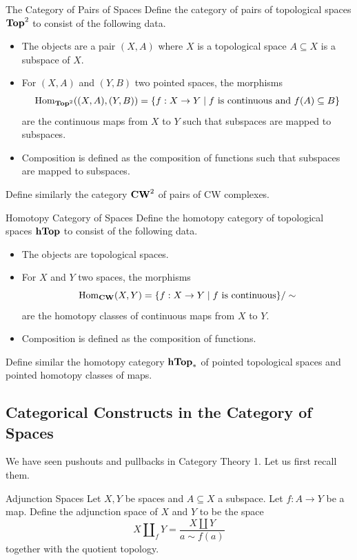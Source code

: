 \documentclass[a4paper]{article}
\begin{document}
\begin{defn}{The Category of Pairs of Spaces}{} Define the category of pairs of topological spaces $\bold{Top}^2$ to consist of the following data. 
\begin{itemize}
\item The objects are a pair $(X,A)$ where $X$ is a topological space $A\subseteq X$ is a subspace of $X$. 
\item For $(X,A)$ and $(Y,B)$ two pointed spaces, the morphisms $$\operatorname{Hom}_{\bold{Top}^2}((X,A),(Y,B))=\{f:X\to Y\;|\;f\text{ is continuous and }f(A)\subseteq B\}$$ are the continuous maps from $X$ to $Y$ such that subspaces are mapped to subspaces. 
\item Composition is defined as the composition of functions such that subspaces are mapped to subspaces. 
\end{itemize}
Define similarly the category $\bold{CW}^2$ of pairs of CW complexes. 
\end{defn}

\begin{defn}{Homotopy Category of Spaces}{} Define the homotopy category of topological spaces $\bold{hTop}$ to consist of the following data. 
\begin{itemize}
\item The objects are topological spaces. 
\item For $X$ and $Y$ two spaces, the morphisms $$\operatorname{Hom}_{\bold{CW}}(X,Y)=\{f:X\to Y\;|\;f\text{ is continuous}\}/\sim$$ are the homotopy classes of continuous maps from $X$ to $Y$. 
\item Composition is defined as the composition of functions. 
\end{itemize}
Define similar the homotopy category $\bold{hTop}_\ast$ of pointed topological spaces and pointed homotopy classes of maps. 
\end{defn}

\subsection{Categorical Constructs in the Category of Spaces}
We have seen pushouts and pullbacks in Category Theory 1. Let us first recall them. 

\begin{defn}{Adjunction Spaces}{} Let $X,Y$ be spaces and $A\subseteq X$ a subspace. Let $f:A\to Y$ be a map. Define the adjunction space of $X$ and $Y$ to be  the space $$X\amalg_fY=\frac{X\amalg Y}{a\sim f(a)}$$ together with the quotient topology. 
\end{defn}
\end{document}
